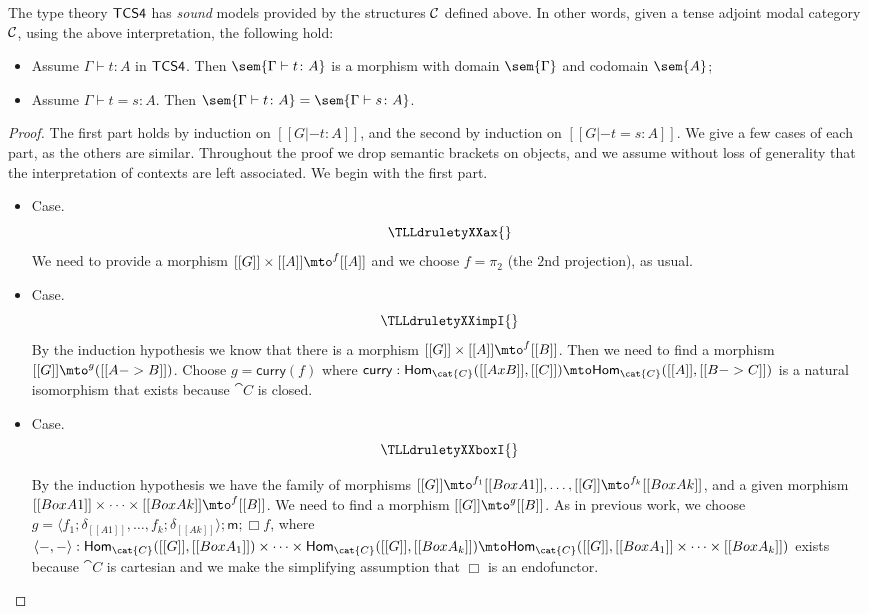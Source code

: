\begin{theorem*}
The type theory $\sf{TCS4}$ has \textit{sound} models provided by the
structures $\cal C$ defined above.  In other words, given a tense
adjoint modal category $\cal C$, using the above interpretation, the
following hold:
\begin{itemize}
\item Assume $\Gamma \vdash t : A$ in $\sf{TCS4}$. Then $\sem{\Gamma
  \vdash t \colon A}$ is a morphism with domain $\sem{\Gamma}$ and
  codomain $\sem{A}$;
\item Assume $\Gamma \vdash t = s \colon A$. Then $\sem{\Gamma
  \vdash t \colon A} = \sem{\Gamma \vdash s \colon A}$.
\end{itemize}
\end{theorem*}
\begin{proof}
  The first part holds by induction on $[[G |- t : A]]$, and the
  second by induction on $[[G |- t = s : A]]$.  We give a few cases of
  each part, as the others are similar.  Throughout the proof we
  drop semantic brackets on objects, and we assume without loss of
  generality that the interpretation of contexts are left associated.
  We begin with the first part.

  \begin{itemize}
  \item[] Case.\\
    \[
    \TLLdruletyXXax{}
    \]
    We need to provide a morphism $[[G]] \times [[A]] \mto^{f}
    [[A]]$ and we choose $f = \pi_2$ (the $2$nd projection), as usual.

    \item[] Case.\\
    \[
    \TLLdruletyXXimpI{}
    \]
    By the induction hypothesis we know that there is a morphism
    $[[G]] \times [[A]] \mto^f [[B]]$.  Then we need  to find a
    morphism $[[G]] \mto^{g} ([[A -> B]])$.  Choose $g =
    \mathsf{curry}(f)$ where $\mathsf{curry} :
    \mathsf{Hom}_{\cat{C}}([[A x B]],[[C]]) \mto
    \mathsf{Hom}_{\cat{C}}([[A]],[[B -> C]])$ is a natural isomorphism
    that exists because $\cat{C}$ is closed.

  \item[] Case.\\
    \[
    \TLLdruletyXXboxI{}
    \]

    By the induction hypothesis we have the family of morphisms $[[G]]
    \mto^{f_1} [[Box A1]], \ldots, [[G]] \mto^{f_k} [[Box Ak]]$, and a given morphism
    $[[Box A1]] \times \cdots \times [[Box Ak]] \mto^f [[B]]$.  We need 
     to find a morphism $[[G]] \mto^{g} [[B]]$.  As in previous work, we choose $g =
    \langle f_1;\delta_{[[A1]]},\ldots,f_k;\delta_{[[Ak]]} \rangle;\mathsf{m};\Box f$, where $\langle -,-\rangle :
    \mathsf{Hom}_{\cat{C}}([[G]],[[Box A_1]]) \times \cdots \times
    \mathsf{Hom}_{\cat{C}}([[G]],[[Box A_k]]) \mto \mathsf{Hom}_{\cat{C}}([[G]],[[Box A_1]]
    \times \cdots \times [[Box A_k]])$ exists because $\cat{C}$ is cartesian and we make the simplifying assumption that $\Box$ is an endofunctor.


\end{itemize}
\end{proof}
